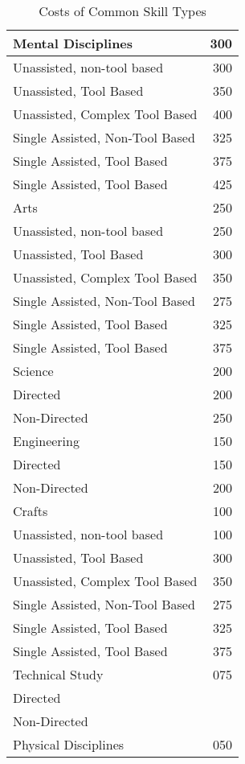 \begin{table}[htb]
\caption{Costs of Common Skill Types}
	\begin{tabular}{||l|r||} \hline
	Mental Disciplines             & 300    \\   \hline
	Unassisted, non-tool based     & 300    \\
	Unassisted, Tool Based         & 350    \\
	Unassisted, Complex Tool Based & 400    \\
	Single Assisted, Non-Tool Based& 325    \\
	Single Assisted, Tool Based    & 375    \\
	Single Assisted, Tool Based    & 425    \\   \hline
	Arts                           & 250    \\   \hline
	Unassisted, non-tool based     & 250    \\
	Unassisted, Tool Based         & 300    \\
	Unassisted, Complex Tool Based & 350    \\
	Single Assisted, Non-Tool Based& 275    \\
	Single Assisted, Tool Based    & 325    \\
	Single Assisted, Tool Based    & 375    \\  \hline
	Science                        & 200    \\  \hline
	Directed                       & 200    \\
	Non-Directed                   & 250    \\  \hline
	Engineering                    & 150    \\  \hline
	Directed                       & 150    \\
	Non-Directed                   & 200    \\  \hline
	Crafts                         & 100    \\  \hline
	Unassisted, non-tool based     & 100    \\
	Unassisted, Tool Based         & 300    \\
	Unassisted, Complex Tool Based & 350    \\
	Single Assisted, Non-Tool Based& 275    \\
	Single Assisted, Tool Based    & 325    \\
	Single Assisted, Tool Based    & 375    \\   \hline
	Technical Study                & 075    \\   \hline
	Directed                       &        \\
	Non-Directed                   &        \\   \hline
	Physical Disciplines           & 050    \\	  \hline
	\end{tabular}
\end{table}
